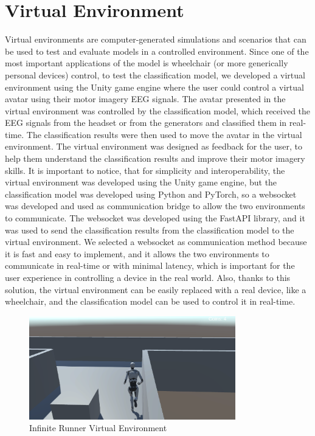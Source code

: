 \section{Virtual Environment}
Virtual environments are computer-generated simulations and scenarios that can be used to test and evaluate models in a controlled environment.
Since one of the most important applications of the model is wheelchair (or more generically personal devices) control, to test the classification model, we developed a virtual environment using the Unity game engine where the user could control a virtual avatar using their motor imagery EEG signals.
The avatar presented in the virtual environment was controlled by the classification model, which received the EEG signals from the headset or from the generators and classified them in real-time.
The classification results were then used to move the avatar in the virtual environment.
The virtual environment was designed as feedback for the user, to help them understand the classification results and improve their motor imagery skills.
It is important to notice, that for simplicity and interoperability, the virtual environment was developed using the Unity game engine, but the classification model was developed using Python and PyTorch, so a websocket was developed and used as communication bridge to allow the two environments to communicate.
The websocket was developed using the FastAPI library, and it was used to send the classification results from the classification model to the virtual environment.
We selected a websocket as communication method because it is fast and easy to implement, and it allows the two environments to communicate in real-time or with minimal latency, which is important for the user experience in controlling a device in the real world.
Also, thanks to this solution, the virtual environment can be easily replaced with a real device, like a wheelchair, and the classification model can be used to control it in real-time.
\begin{figure}[!htbp]
    \centering
    \includegraphics[width=0.8\textwidth]{Figures/Approach/infinite_runner}
    \caption{Infinite Runner Virtual Environment}
    \label{fig:infinite_runner}
\end{figure}

